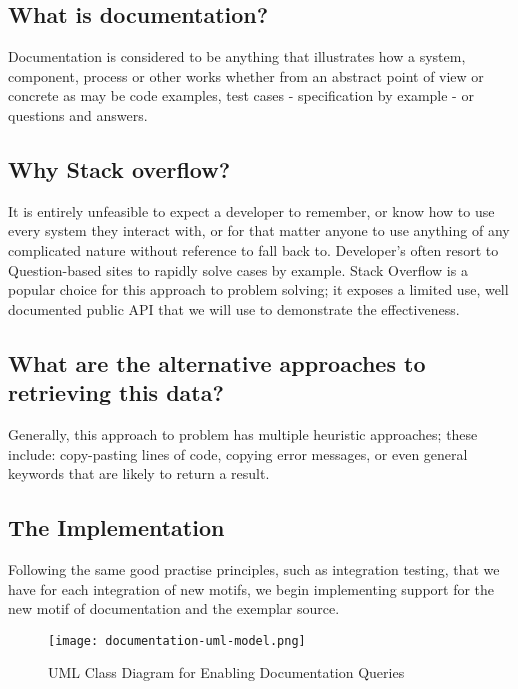 \subsection{What is documentation?}

Documentation is considered to be anything that illustrates how a system, component, process or other works whether from an abstract point of view or concrete as may be code examples, test cases - specification by example - or questions and answers.

\subsection{Why Stack overflow?}

It is entirely unfeasible to expect a developer to remember, or know how to use every system they interact with, or for that matter anyone to use anything of any complicated nature without reference to fall back to. Developer's often resort to Question-based sites to rapidly solve cases by example. Stack Overflow is a popular choice for this approach to problem solving; it exposes a limited use, well documented public API that we will use to demonstrate the effectiveness.

\subsection{What are the alternative approaches to retrieving this data?}

Generally, this approach to problem has multiple heuristic approaches; these include: copy-pasting lines of code, copying error messages, or even general keywords that are likely to return a result. 

\subsection{The Implementation}

Following the same good practise principles, such as integration testing, that we have for each integration of new motifs, we begin implementing support for the new motif of documentation and the exemplar source. 

\begin{figure}[h!]
	\centering
	\texttt{[image: documentation-uml-model.png]}
	\caption{UML Class Diagram for Enabling Documentation Queries}
	\label{fig:documentationUmlClass}
\end{figure}


